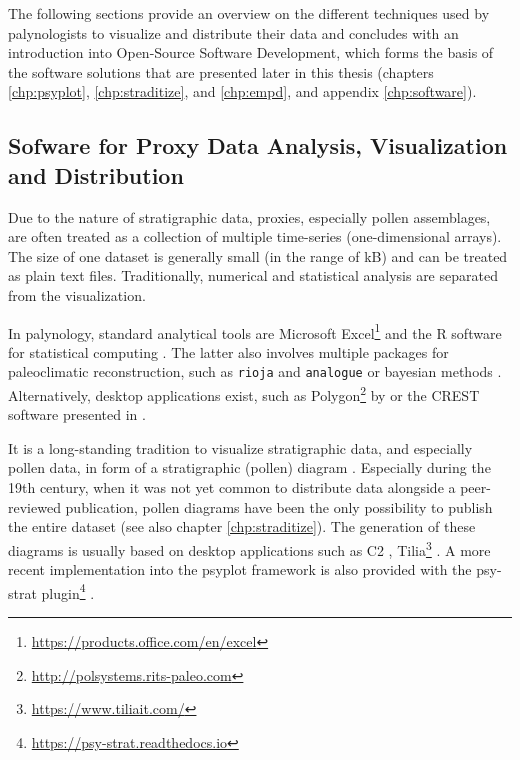\begin{refsection}
The following sections provide an overview on the different techniques used by palynologists to visualize and distribute their data and concludes with an introduction into Open-Source Software Development, which forms the basis of the software solutions that are presented later in this thesis (chapters \ref{chp:psyplot}, \ref{chp:straditize}, and \ref{chp:empd}, and appendix \ref{chp:software}).

\subsection{Sofware for Proxy Data Analysis, Visualization and Distribution} \label{sec:intro-software-data}

Due to the nature of stratigraphic data, proxies, especially pollen assemblages, are often treated as a collection of multiple time-series (one-dimensional arrays). The size of one dataset is generally small (in the range of kB) and can be treated as plain text files. Traditionally, numerical and statistical analysis are separated from the visualization.

In palynology, standard analytical tools are Microsoft Excel\footnote{\url{https://products.office.com/en/excel}} and the R software for statistical computing \citep{RCT2019}. The latter also involves multiple packages for paleoclimatic reconstruction, such as \texttt{rioja} \citep{Juggins2017} and \texttt{analogue} \citep{SimpsonOksanen2019, Simpson2007} or bayesian methods \citep{NolanTiptonBoothEtAl2019, Tipton2017}. Alternatively, desktop applications exist, such as Polygon\footnote{\url{http://polsystems.rits-paleo.com}} by \cite{NakagawaTarasovNishidaEtAl2002} or the CREST software presented in \cite{ChevalierCheddadiChase2014, Chevalier2019}.

It is a long-standing tradition to visualize stratigraphic data, and especially pollen data, in form of a stratigraphic (pollen) diagram \citep{Bradley1985, Grimm1988}. Especially during the 19th century, when it was not yet common to distribute data alongside a peer-reviewed publication, pollen diagrams have been the only possibility to publish the entire dataset (see also chapter \ref{chp:straditize}). The generation of these diagrams is usually based on desktop applications such as C2 \citep{Juggins2007}, Tilia\footnote{\url{https://www.tiliait.com/}} \citep{Grimm1988, Grimm1991}. A more recent implementation into the psyplot framework \citep[chapter \ref{chp:psyplot}]{Sommer2017} is also provided with the psy-strat plugin\footnote{\url{https://psy-strat.readthedocs.io}} \citep{Sommer2019}.


\end{refsection}
